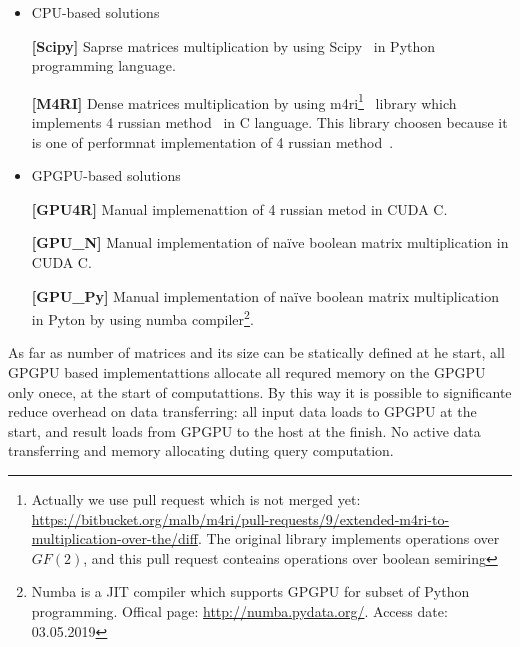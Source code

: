 \begin{itemize}
  \item CPU-based solutions 
    
    \textbf{[Scipy]} Saprse matrices multiplication by using Scipy~\cite{scipy} in Python programming language.

    \textbf{[M4RI]} Dense matrices multiplication by using m4ri\footnote{Actually we use pull request which is not merged yet: \url{https://bitbucket.org/malb/m4ri/pull-requests/9/extended-m4ri-to-multiplication-over-the/diff}. The original library implements operations over $GF(2)$, and this pull request conteains operations over boolean semiring}~\cite{M4RI} library which implements 4 russian method~\cite{arlazarov1970economical} in C language.
    This library choosen because it is one of performnat implementation of 4 russian method~\cite{albrechtefficient}.
  \item GPGPU-based solutions
    
    \textbf{[GPU4R]} Manual implemenattion of 4 russian metod in CUDA C.
 
    \textbf{[GPU\_N]} Manual implementation of na\"ive boolean matrix multiplication in CUDA C.
    
    \textbf{[GPU\_Py]} Manual implementation of na\"ive boolean matrix multiplication in Pyton by using numba compiler\footnote{Numba is a JIT compiler which supports GPGPU for subset of Python programming. Offical page: \url{http://numba.pydata.org/}. Access date: 03.05.2019}. 
 
\end{itemize}

As far as number of matrices and its size can be statically defined at he start, all GPGPU based implementattions allocate all requred memory on the GPGPU only onece, at the start of computattions.
By this way it is possible to significante reduce overhead on data transferring: all input data loads to GPGPU at the start, and result loads from GPGPU to the host at the finish.
No active data transferring and memory allocating duting query computation. 
